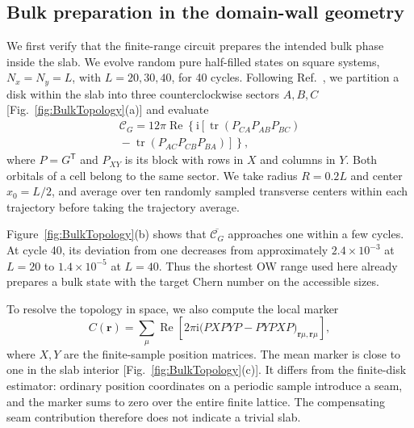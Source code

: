 \documentclass[aps,prb,10pt,twocolumn,superscriptaddress,longbibliography,floatfix]{revtex4-2}
\newcommand{\ii}{\mathrm{i}}
\newcommand{\mc}[1]{\mathcal{#1}}
\newcommand{\bfr}{\boldsymbol r}
\begin{document}
{\color{blue}
\subsection{Bulk preparation in the domain-wall geometry}
\label{sec:BulkTopology}

We first verify that the finite-range circuit prepares the intended bulk phase inside the slab. We evolve random pure half-filled states on square systems, $N_x=N_y=L$, with $L=20,30,40$, for 40 cycles. Following Ref.~\cite{Kitaev2006}, we partition a disk within the slab into three counterclockwise sectors $A,B,C$ [Fig.~\ref{fig:BulkTopology}(a)] and evaluate
\begin{align}
    \mc C_G=12\pi\operatorname{Re}\!\left\{\ii\left[\operatorname{tr}(P_{CA}P_{AB}P_{BC})\right.\right.\nonumber\\
    \left.\left.{}-\operatorname{tr}(P_{AC}P_{CB}P_{BA})\right]\right\},
    \label{eq:KitaevChern}
\end{align}
where $P=G^{\mathsf T}$ and $P_{XY}$ is its block with rows in $X$ and columns in $Y$. Both orbitals of a cell belong to the same sector. We take radius $R=0.2L$ and center $x_0=L/2$, and average over ten randomly sampled transverse centers within each trajectory before taking the trajectory average.

Figure~\ref{fig:BulkTopology}(b) shows that $\overline{\mc C_G}$ approaches one within a few cycles. At cycle 40, its deviation from one decreases from approximately $2.4\times10^{-3}$ at $L=20$ to $1.4\times10^{-5}$ at $L=40$. Thus the shortest OW range used here already prepares a bulk state with the target Chern number on the accessible sizes.

To resolve the topology in space, we also compute the local marker
\begin{equation}
 C(\bfr)=\sum_\mu\operatorname{Re}\!\left[2\pi\ii\big(PXPYP-PYPXP\big)_{\bfr\mu,\bfr\mu}\right],
 \label{eq:LocalMarker}
\end{equation}
where $X,Y$ are the finite-sample position matrices. The mean marker is close to one in the slab interior [Fig.~\ref{fig:BulkTopology}(c)]. It differs from the finite-disk estimator: ordinary position coordinates on a periodic sample introduce a seam, and the marker sums to zero over the entire finite lattice. The compensating seam contribution therefore does not indicate a trivial slab.
}
\end{document}
